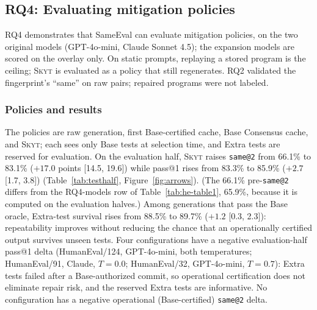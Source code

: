 \documentclass[acmsmall,screen,review,anonymous]{acmart}
\makeatletter
\newcommand{\skyt}{\textsc{Skyt}}
\newcommand{\sameeval}{SameEval}
\newcommand{\sameat}{\mbox{\texttt{same@2}}}
\makeatother
\begin{document}
\subsection{RQ4: Evaluating mitigation policies}
\label{sec:rq4}

RQ4 demonstrates that \sameeval{} can evaluate mitigation policies, on the two
original models (GPT-4o-mini, Claude Sonnet 4.5); the expansion models are
scored on the overlay only.
On static prompts, replaying a stored program is the ceiling; \skyt{} is
evaluated as a policy that still regenerates.
RQ2 validated the fingerprint's ``same'' on raw pairs; repaired programs were not labeled.

\subsubsection{Policies and results}
\label{sec:rq4-policies}
The policies are raw generation, first Base-certified cache, Base Consensus
cache, and \skyt{}; each sees only Base tests at selection time, and Extra
tests are reserved for evaluation.
On the evaluation half, \skyt{} raises \sameat{} from 66.1\% to 83.1\%
($+17.0$ points [14.5, 19.6]) while pass@1 rises from 83.3\% to 85.9\%
($+2.7$ [1.7, 3.8]) (Table~\ref{tab:testhalf}, Figure~\ref{fig:arrows}).
(The 66.1\% pre-\sameat{} differs from the RQ4-models row of
Table~\ref{tab:he-table1}, 65.9\%, because it is computed on the
evaluation halves.)
Among generations that pass the Base oracle, Extra-test survival rises from
88.5\% to 89.7\% ($+1.2$ [0.3, 2.3]): repeatability improves without reducing
the chance that an operationally certified output survives unseen tests.
Four configurations have a negative evaluation-half pass@1 delta (HumanEval/124,
GPT-4o-mini, both temperatures; HumanEval/91, Claude, $T{=}0.0$;
HumanEval/32, GPT-4o-mini, $T{=}0.7$): Extra tests failed after a
Base-authorized commit, so operational certification does not eliminate
repair risk, and the reserved Extra tests are informative.
No configuration has a negative operational (Base-certified) \sameat{} delta.
\end{document}
